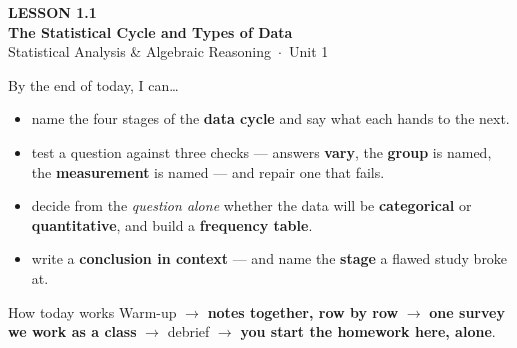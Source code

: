 \documentclass[aspectratio=169, 11pt]{beamer}
\begin{document}
{
\begin{frame}[plain]
  \vspace{2.8cm}\hspace{0.55cm}%
  \begin{minipage}{0.9\textwidth}
    {\color{goldacc}\bfseries\small LESSON 1.1}\\[0.5cm]
    {\color{white}\bfseries\LARGE The Statistical Cycle and Types of Data}\\[1.2cm]
    {\color{frostmid}\small Statistical Analysis \& Algebraic Reasoning~$\cdot$~Unit 1}
  \end{minipage}
\end{frame}
}

\begin{frame}[t, plain]
  By the end of today, I can\ldots
  \begin{itemize}\setlength{\itemsep}{5pt}
    \item name the four stages of the \textbf{data cycle} and say what each hands to the next.
    \item test a question against three checks --- answers \textbf{vary}, the \textbf{group}
          is named, the \textbf{measurement} is named --- and repair one that fails.
    \item decide from the \emph{question alone} whether the data will be
          \textbf{categorical} or \textbf{quantitative}, and build a \textbf{frequency table}.
    \item write a \textbf{conclusion in context} --- and name the \textbf{stage} a flawed
          study broke at.
  \end{itemize}
  \begin{block}{How today works}
    Warm-up $\to$ \textbf{notes together, row by row} $\to$ \textbf{one survey we work as a
    class} $\to$ debrief $\to$ \textbf{you start the homework here, alone}.
  \end{block}
\end{frame}
\end{document}
